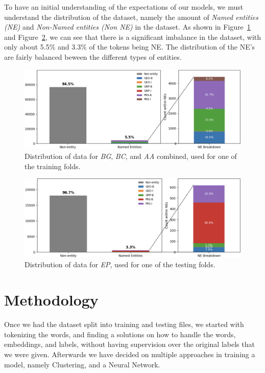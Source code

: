 \documentclass[11pt]{article}
\begin{document}
To have an initial understanding of the expectations of our models, we must understand the distribution of the dataset, namely the amount of
\textit{Named entities (NE)} and \textit{Non-Named entities (Non NE)} in the dataset. As shown in Figure~\ref{fig:NER-Train} and Figure~\ref{fig:NER-Test}, 
we can see that there is a significant imbalance in the dataset, with only about 5.5\% and 3.3\% of the tokens being NE. The distribution of
the NE's are fairly balanced beween the different types of entities. 

\begin{figure}[H]
  \includegraphics[width=\columnwidth]{NER-Train.png}
  \caption{Distribution of data for \textit{BG}, \textit{BC}, and \textit{AA} combined, used for one of the training folds.}
  \label{fig:NER-Train}
\end{figure}

\begin{figure}[H]
  \includegraphics[width=\columnwidth]{NER-Test.png}
  \caption{Distribution of data for \textit{EP}, used for one of the testing folds.}
  \label{fig:NER-Test}
\end{figure}

\section{Methodology}

Once we had the dataset split into training and testing files, we started with tokenizing the words, and finding a solutions on how to
handle the words, embeddings, and labels, without having supervision over the original labels that we were given. Afterwards we have decided on
multiple approaches in training a model, namely Clustering, and a Neural Network.
\end{document}
